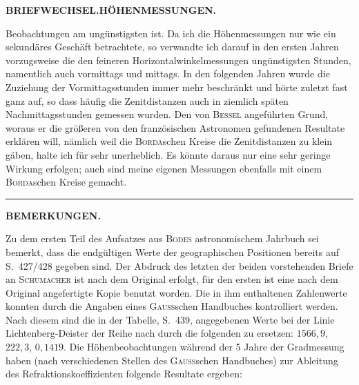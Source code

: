 \par\clearpage
\noindent{}\hfill{\small\textbf{BRIEFWECHSEL.\quad HÖHENMESSUNGEN.}}\hfill\null\par\medskip
\noindent Beobachtungen am ungünstigsten ist. Da ich die Höhenmessungen nur wie
ein sekundäres Geschäft betrachtete, so verwandte ich darauf in den ersten
Jahren vorzugsweise die den feineren Horizontalwinkelmessungen ungünstigsten
Stunden, namentlich auch vormittags und mittags. In den folgenden Jahren
wurde die Zuziehung der Vormittagsstunden immer mehr beschränkt und hörte
zuletzt fast ganz auf, so dass häufig die Zenitdistanzen auch in ziemlich
späten Nachmittagsstunden gemessen wurden. Den von \textsc{Bessel} angeführten
Grund, woraus er die größeren von den französischen Astronomen gefundenen
Resultate erklären will, nämlich weil die \textsc{Borda}schen Kreise die Zenitdistanzen zu klein gäben, halte ich für sehr unerheblich. Es könnte daraus nur
eine sehr geringe Wirkung erfolgen; auch sind meine eigenen Messungen
ebenfalls mit einem \textsc{Borda}schen Kreise gemacht.
\begin{center}\rule{.16\linewidth}{.4pt}\end{center}
\begin{center}\textbf{BEMERKUNGEN.}\end{center}
\begingroup\small
\par\noindent\hspace*{\parindent}Zu dem ersten Teil des Aufsatzes aus \textsc{Bodes} astronomischem Jahrbuch sei bemerkt, dass die endgültigen Werte der geographischen Positionen bereits auf S.~427/428 gegeben sind. Der Abdruck des
letzten der beiden vorstehenden Briefe an \textsc{Schumacher} ist nach dem Original erfolgt, für den ersten ist
eine nach dem Original angefertigte Kopie benutzt worden. Die in ihm enthaltenen Zahlenwerte konnten
durch die Angaben eines \textsc{Gauss}schen Handbuches kontrolliert werden. Nach diesem sind die in der Tabelle,
S.~439, angegebenen Werte bei der Linie Lichtenberg-Deister der Reihe nach durch die folgenden zu ersetzen: \(1566{,}9\), \(222{,}3\), \(0{,}1419\). Die Höhenbeobachtungen während der 5 Jahre der Gradmessung haben (nach
verschiedenen Stellen des \textsc{Gauss}schen Handbuches) zur Ableitung des Refraktionskoeffizienten folgende Resultate ergeben:
